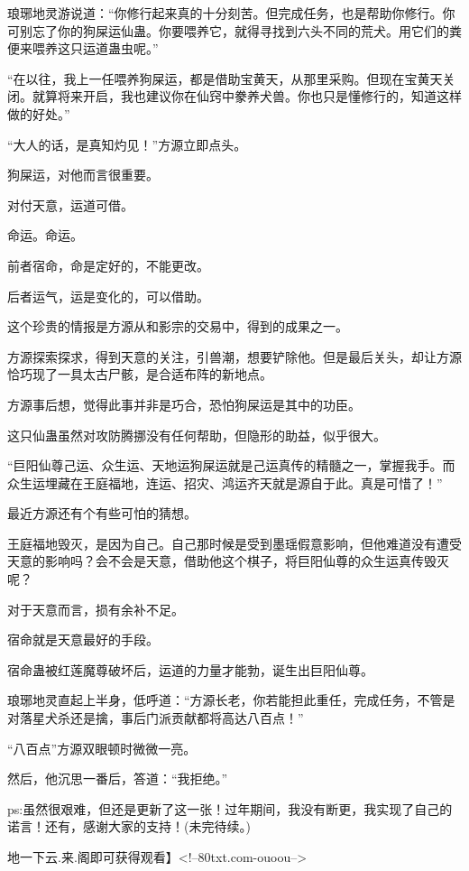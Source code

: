 \begin{this_body}
琅琊地灵游说道：“你修行起来真的十分刻苦。但完成任务，也是帮助你修行。你可别忘了你的狗屎运仙蛊。你要喂养它，就得寻找到六头不同的荒犬。用它们的粪便来喂养这只运道蛊虫呢。”

“在以往，我上一任喂养狗屎运，都是借助宝黄天，从那里采购。但现在宝黄天关闭。就算将来开启，我也建议你在仙窍中豢养犬兽。你也只是懂修行的，知道这样做的好处。”

“大人的话，是真知灼见！”方源立即点头。

狗屎运，对他而言很重要。

对付天意，运道可借。

命运。命运。

前者宿命，命是定好的，不能更改。

后者运气，运是变化的，可以借助。

这个珍贵的情报是方源从和影宗的交易中，得到的成果之一。

方源探索探求，得到天意的关注，引兽潮，想要铲除他。但是最后关头，却让方源恰巧现了一具太古尸骸，是合适布阵的新地点。

方源事后想，觉得此事并非是巧合，恐怕狗屎运是其中的功臣。

这只仙蛊虽然对攻防腾挪没有任何帮助，但隐形的助益，似乎很大。

“巨阳仙尊己运、众生运、天地运狗屎运就是己运真传的精髓之一，掌握我手。而众生运埋藏在王庭福地，连运、招灾、鸿运齐天就是源自于此。真是可惜了！”

最近方源还有个有些可怕的猜想。

王庭福地毁灭，是因为自己。自己那时候是受到墨瑶假意影响，但他难道没有遭受天意的影响吗？会不会是天意，借助他这个棋子，将巨阳仙尊的众生运真传毁灭呢？

对于天意而言，损有余补不足。

宿命就是天意最好的手段。

宿命蛊被红莲魔尊破坏后，运道的力量才能勃，诞生出巨阳仙尊。

琅琊地灵直起上半身，低呼道：“方源长老，你若能担此重任，完成任务，不管是对落星犬杀还是擒，事后门派贡献都将高达八百点！”

“八百点”方源双眼顿时微微一亮。

然后，他沉思一番后，答道：“我拒绝。”

ps:虽然很艰难，但还是更新了这一张！过年期间，我没有断更，我实现了自己的诺言！还有，感谢大家的支持！(未完待续。)

地一下云.来.阁即可获得观看】<!--80txt.com-ouoou-->

\end{this_body}

